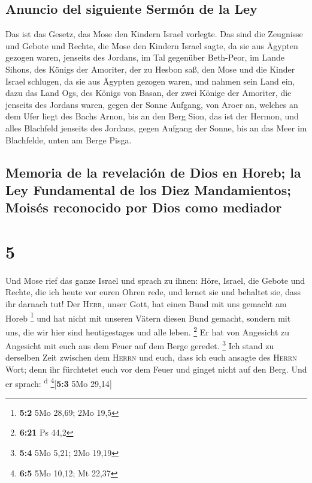\hypertarget{anuncio-del-siguiente-sermuxf3n-de-la-ley}{%
\subsection{Anuncio del siguiente Sermón de la
Ley}\label{anuncio-del-siguiente-sermuxf3n-de-la-ley}}

 Das ist das Gesetz, das Mose den Kindern Israel
vorlegte.  Das sind die Zeugnisse und Gebote und Rechte,
die Mose den Kindern Israel sagte, da sie aus Ägypten gezogen waren,
 jenseits des Jordans, im Tal gegenüber Beth-Peor, im
Lande Sihons, des Königs der Amoriter, der zu Hesbon saß, den Mose und
die Kinder Israel schlugen, da sie aus Ägypten gezogen waren,
 und nahmen sein Land ein, dazu das Land Ogs, des Königs
von Basan, der zwei Könige der Amoriter, die jenseits des Jordans waren,
gegen der Sonne Aufgang,  von Aroer an, welches an dem
Ufer liegt des Bachs Arnon, bis an den Berg Sion, das ist der Hermon,
 und alles Blachfeld jenseits des Jordans, gegen Aufgang
der Sonne, bis an das Meer im Blachfelde, unten am Berge Pisga.

\hypertarget{memoria-de-la-revelaciuxf3n-de-dios-en-horeb-la-ley-fundamental-de-los-diez-mandamientos-moisuxe9s-reconocido-por-dios-como-mediador}{%
\subsection{Memoria de la revelación de Dios en Horeb; la Ley
Fundamental de los Diez Mandamientos; Moisés reconocido por Dios como
mediador}\label{memoria-de-la-revelaciuxf3n-de-dios-en-horeb-la-ley-fundamental-de-los-diez-mandamientos-moisuxe9s-reconocido-por-dios-como-mediador}}

\hypertarget{section-4}{%
\section{5}\label{section-4}}

 Und Mose rief das ganze Israel und sprach zu ihnen: Höre,
Israel, die Gebote und Rechte, die ich heute vor euren Ohren rede, und
lernet sie und behaltet sie, dass ihr darnach tut!  Der
\textsc{Herr}, unser Gott, hat einen Bund mit uns gemacht am Horeb
\footnote{\textbf{5:2} 5Mo 28,69; 2Mo 19,5}  und hat nicht
mit unseren Vätern diesen Bund gemacht, sondern mit uns, die wir hier
sind heutigestages und alle leben. \footnote{\textbf{6:21} Ps 44,2}
 Er hat von Angesicht zu Angesicht mit euch aus dem Feuer
auf dem Berge geredet. \footnote{\textbf{5:4} 5Mo 5,21; 2Mo 19,19}
 Ich stand zu derselben Zeit zwischen dem \textsc{Herrn}
und euch, dass ich euch ansagte des \textsc{Herrn} Wort; denn ihr
fürchtetet euch vor dem Feuer und ginget nicht auf den Berg. Und er
sprach: \textsuperscript{d} \footnote{\textbf{6:5} 5Mo 10,12; Mt 22,37}{[}\textbf{5:3}
5Mo 29,14{]}

